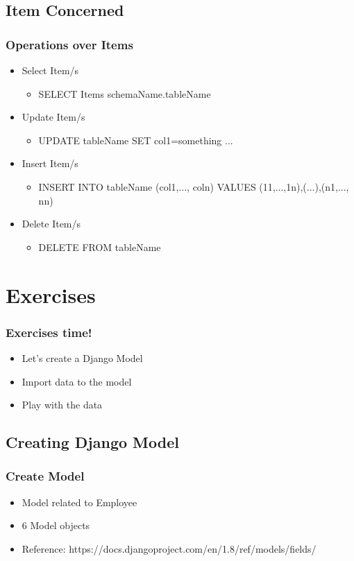 	\subsection{Item Concerned}
	\begin{frame}
		\frametitle{Operations over Items}
	 	\begin{itemize}[<+->]
	 		\item Select Item/s
	 		\begin{itemize}
		 		\item SELECT Items schemaName.tableName 
			\end{itemize}
	 		\item Update Item/s
	 		\begin{itemize}
		 		\item  UPDATE tableName SET col1=something ...
			\end{itemize}
	 		\item Insert Item/s
	 		\begin{itemize}
		 		\item INSERT INTO tableName (col1,..., coln) VALUES (11,...,1n),(...),(n1,..., nn)
			\end{itemize}
	 		\item Delete Item/s
	 		\begin{itemize}
		 		\item DELETE FROM tableName
			\end{itemize}
	 	\end{itemize}
	\end{frame}

\section{Exercises}

	\begin{frame}
	 	\frametitle{Exercises time!}
	 	\begin{itemize}
	 		\item Let's create a Django Model
	 		\item Import data to the model
	 		\item Play with the data
	 	\end{itemize}
	\end{frame}

	\subsection{Creating Django Model}
	\begin{frame}
		\frametitle{Create Model}
		\begin{itemize}[<+->]
			\item Model related to Employee
			\item 6 Model objects
			\item Reference: https://docs.djangoproject.com/en/1.8/ref/models/fields/
		\end{itemize}
	\end{frame}

